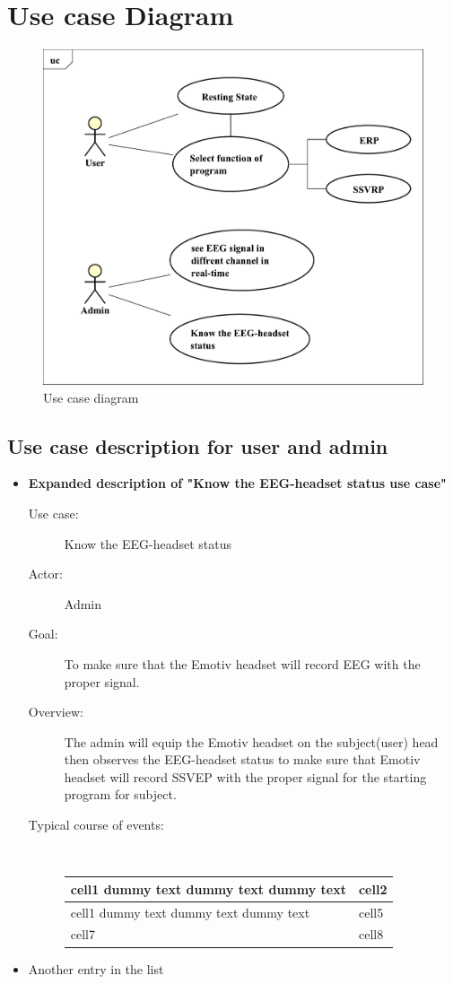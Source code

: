 \section{Use case Diagram}

\begin{figure}[ht]
\centering \includegraphics[scale=0.5]{chapter4/uc.pdf}
\caption{Use case diagram}
\end{figure}


\newpage{}


\subsection{Use case description for user and admin}
\begin{itemize}
\item \textbf{Expanded description of "Know the EEG-headset status
use case" }

\begin{description}
\item [{Use case:}] Know the EEG-headset status 
\item [{Actor:}] Admin 
\item [{Goal:}] To make sure that the Emotiv headset will record EEG with
the proper signal. 
\item [{Overview:}] The admin will equip the Emotiv headset on the subject(user)
head then observes the EEG-headset status to make sure that Emotiv
headset will record SSVEP with the proper signal for the starting
program for subject. 
\item [{Typical course of events:}]~

\begin{tabular}{ | m{7cm}| m{7cm} | }
\hline 
\textbf{cell1  dummy text dummy text dummy text} & \textbf{cell2}  \tabularnewline
\hline 
cell1 dummy text dummy text dummy text  & cell5  \tabularnewline
\hline 
cell7  & cell8  \tabularnewline
\hline 
\end{tabular}

\end{description}
\item Another entry in the list 
\end{itemize}

